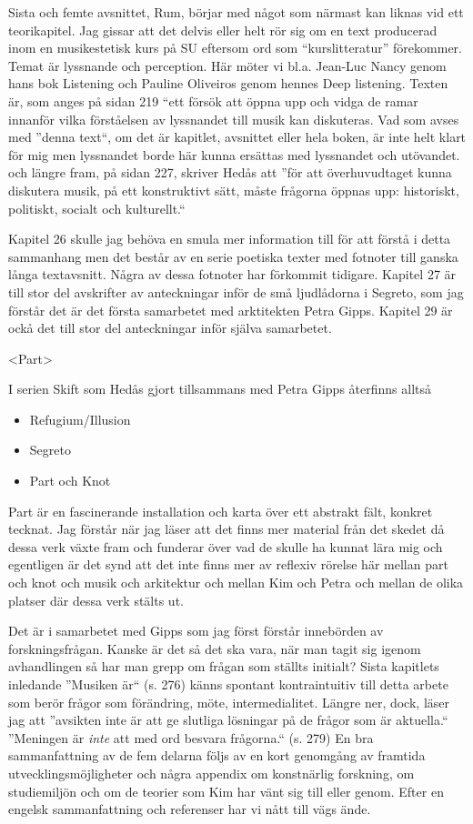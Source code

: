 \documentclass{article}
\begin{document}
Sista och femte avsnittet, Rum, börjar med något som närmast kan liknas vid ett teorikapitel. Jag gissar att det delvis eller helt rör sig om en text producerad inom en musikestetisk kurs på SU eftersom ord som ``kurslitteratur'' förekommer. Temat är lyssnande och perception. Här möter vi bl.a. Jean-Luc Nancy genom hans bok Listening och Pauline Oliveiros genom hennes Deep listening. Texten är, som anges på sidan 219 ``ett försök att öppna upp och vidga de ramar innanför vilka förståelsen av lyssnandet till musik kan diskuteras. Vad som avses med ''denna text``, om det är kapitlet, avsnittet eller hela boken, är inte helt klart för mig men lyssnandet borde här kunna ersättas med lyssnandet och utövandet. och längre fram, på sidan 227, skriver Hedås att ''för att överhuvudtaget kunna diskutera musik, på ett konstruktivt sätt, måste frågorna öppnas upp: historiskt, politiskt, socialt och kulturellt.``

Kapitel 26 skulle jag behöva en smula mer information till för att förstå i detta sammanhang men det består av en serie poetiska texter med fotnoter till ganska långa textavsnitt. Några av dessa fotnoter har förkommit tidigare. Kapitel 27 är till stor del avskrifter av anteckningar inför de små ljudlådorna i Segreto, som jag förstår det är det första samarbetet med arktitekten Petra Gipps. Kapitel 29 är ockå det till stor del anteckningar inför själva samarbetet.

\textless{}Part\textgreater{}

I serien Skift som Hedås gjort tillsammans med Petra Gipps återfinns alltså

\begin{itemize}
\item Refugium/Illusion
\item Segreto
\item Part och Knot
\end{itemize}

Part är en fascinerande installation och karta över ett abstrakt fält, konkret tecknat. Jag förstår när jag läser att det finns mer material från det skedet då dessa verk växte fram och funderar över vad de skulle ha kunnat lära mig och egentligen är det synd att det inte finns mer av reflexiv rörelse här mellan part och knot och musik och arkitektur och mellan Kim och Petra och mellan de olika platser där dessa verk stälts ut.

Det är i samarbetet med Gipps som jag först förstår innebörden av forskningsfrågan. Kanske är det så det ska vara, när man tagit sig igenom avhandlingen så har man grepp om frågan som ställts initialt? Sista kapitlets inledande ''Musiken är`` (s. 276) känns spontant kontraintuitiv till detta arbete som berör frågor som förändring, möte, intermedialitet. Längre ner, dock, läser jag att ''avsikten inte är att ge slutliga lösningar på de frågor som är aktuella.`` ''Meningen är \emph{inte} att med ord besvara frågorna.`` (s. 279) En bra sammanfattning av de fem delarna följs av en kort genomgång av framtida utvecklingsmöjligheter och några appendix om konstnärlig forskning, om studiemiljön och om de teorier som Kim har vänt sig till eller genom. Efter en engelsk sammanfattning och referenser har vi nått till vägs ände.
\end{document}
